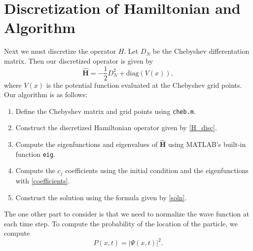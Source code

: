 \documentclass{article}
\begin{document}
\section{Discretization of Hamiltonian and Algorithm}
Next we must discretize the operator $H$. Let $D_N$ be the Chebyshev differentation matrix. Then our discretized operator is given by
\begin{equation}
    \hat{\mathbf{H}} = -\frac{1}{2}D_N^2 + \text{diag}(V(x)), \label{H_disc}
\end{equation}
where $V(x)$ is the potential function evaluated at the Chebyshev grid points. Our algorithm is as follows:
\begin{enumerate}
    \item Define the Chebyshev matrix and grid points using \texttt{cheb.m}.
    \item Construct the discretized Hamiltonian operator given by \eqref{H_disc}.
    \item Compute the eigenfunctions and eigenvalues of $\hat{\mathbf{H}}$ using MATLAB's built-in function \texttt{eig}.
    \item Compute the $c_j$ coefficients using the initial condition and the eigenfunctions with \eqref{coefficients}.
    \item Construct the solution using the formula given by \eqref{soln}.
\end{enumerate}
The one other part to consider is that we need to normalize the wave function at each time step. To compute the probability of the location of the particle, we compute
$$P(x,t) = |\Psi(x,t)|^2.$$
\end{document}

